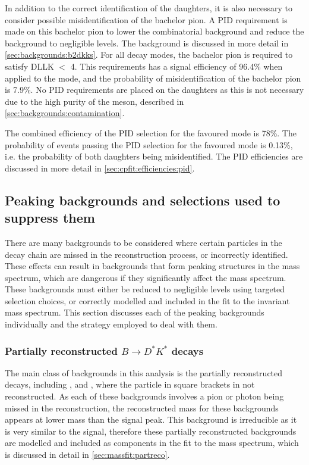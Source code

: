 In addition to the correct identification of the \Dz daughters, it is also necessary to consider possible misidentification of the bachelor pion. A PID requirement is made on this bachelor pion to lower the combinatorial background and reduce the \decay{\Bm}{\D\KS\Km} background to negligible levels. The \decay{\Bm}{\D\KS\Km} background is discussed in more detail in \sect\ref{sec:backgrounds:b2dkks}. For all \Dz decay modes, the bachelor pion is required to satisfy DLLK $<$ 4. This requirements has a signal efficiency of 96.4\% when applied to the \kpi mode, and the probability of misidentification of the bachelor pion is 7.9\%. No PID requirements are placed on the \KS daughters as this is not necessary due to the high purity of the \KS meson, described in \sect\ref{sec:backgrounds:contamination}. 

The combined efficiency of the PID selection for the \kpi favoured mode is 78\%. The probability of \pik events passing the PID selection for the favoured mode is 0.13\%, i.e. the probability of both \Dz daughters being misidentified. The PID efficiencies are discussed in more detail in \sect\ref{sec:cpfit:efficiencies:pid}. 

\subsection{Peaking backgrounds and selections used to suppress them}
\label{sec:backgrounds}

There are many backgrounds to be considered where certain particles in the decay chain are missed in the reconstruction process, or incorrectly identified. These effects can result in backgrounds that form peaking structures in the \Bm mass spectrum, which are dangerous if they significantly affect the \Bm mass spectrum. These backgrounds must either be reduced to negligible levels using targeted selection choices, or correctly modelled and included in the fit to the invariant \Bm mass spectrum. This section discusses each of the peaking backgrounds individually and the strategy employed to deal with them.

\subsubsection{Partially reconstructed \boldmath$B \to D^*K^*$ decays}
\label{sec:backgrounds:partreco}

The main class of backgrounds in this analysis is the partially reconstructed \decay{\B}{\Dstar\Kstar} decays, including \decay{\Bm}{(\decay{\Dstarz}{\Dz[\piz]})\Kstarm}, \decay{\Bm}{(\decay{\Dstarz}{\Dz[\gamma]})\Kstarm} and \decay{\Bd}{(\decay{\Dstarp}{\Dz[\pip]})\Kstarm}, where the particle in square brackets in not reconstructed. As each of these backgrounds involves a pion or photon being missed in the reconstruction, the reconstructed \Bm mass for these backgrounds appears at lower mass than the signal peak. This background is irreducible as it is very similar to the signal, therefore these partially reconstructed backgrounds are modelled and included as components in the fit to the \Bm mass spectrum, which is discussed in detail in \sect\ref{sec:massfit:partreco}.

